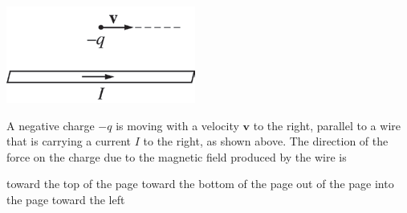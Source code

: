 \begin{center}
\includegraphics[scale=0.5]{images/img-008-022.png}
\end{center}

\begin{questions}\setcounter{question}{29}\question
A negative charge $-q$ is moving with a velocity $\mathbf{v}$ to the right, parallel to a wire that is carrying a current $I$ to the right, as shown above. The direction of the force on the charge due to the magnetic field produced by the wire is

\begin{choices}
\choice toward the top of the page
\choice toward the bottom of the page
\choice out of the page
\choice into the page
\choice toward the left
\end{choices}\end{questions}

